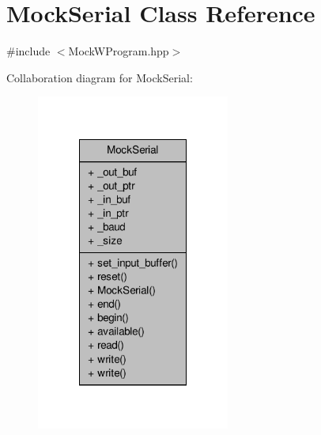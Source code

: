 \hypertarget{class_mock_serial}{\section{Mock\-Serial Class Reference}
\label{class_mock_serial}
}


{\ttfamily \#include $<$Mock\-W\-Program.\-hpp$>$}



Collaboration diagram for Mock\-Serial\-:\nopagebreak
\begin{figure}[H]
\begin{center}
\leavevmode
\includegraphics[width=180pt]{class_mock_serial__coll__graph}
\end{center}
\end{figure}

